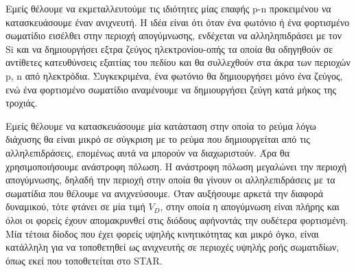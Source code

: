 	Εμείς θέλουμε να εκμεταλλευτούμε τις ιδιότητες μίας επαφής p-n προκειμένου να κατασκευάσουμε έναν ανιχνευτή. Η ιδέα είναι ότι όταν ένα φωτόνιο ή ένα φορτισμένο σωματίδιο εισέλθει στην περιοχή απογύμνωσης, ενδέχεται να αλληληπιδράσει με τον Si και να δημιουργήσει εξτρα ζεύγος ηλεκτρονίου-οπής τα οποία θα οδηγηθούν σε αντίθετες κατευθύνσεις εξαιτίας του πεδίου και θα συλλεχθούν στα άκρα των περιοχών p, n από ηλεκτρόδια. Συγκεκριμένα, ένα φωτόνιο θα δημιουργήσει μόνο ένα ζεύγος, ενώ ένα φορτισμένο σωματίδιο αναμένουμε να δημιουργήσει ζεύγη κατά μήκος της τροχιάς.
	 
	 Εμείς θέλουμε να κατασκευάσουμε μία κατάσταση στην οποία το ρεύμα λόγω διάχυσης θα είναι μικρό σε σύγκριση με το ρεύμα που δημιουργείται από τις αλληλεπιδράσεις, επομένως αυτά να μπορούν να διαχωριστούν. Άρα θα χρησιμοποιήσουμε ανάστροφη πόλωση. Η ανάστροφη πόλωση μεγαλώνει την περιοχή απογύμνωσης, δηλαδή την περιοχή στην οποία θα γίνουν οι αλληλεπιδράσεις με τα σωματίδια που θέλουμε να ανιχνεύσουμε.
	Όταν αυξήσουμε αρκετά την διαφορά δυναμικού, τότε φτάνει σε μία τιμή $V_D$, στην οποία η απογύμνωση είναι πλήρης και όλοι οι φορείς έχουν απομακρυνθεί στις διόδους αφήνοντάς την ουδέτερα φορτισμένη.	
	Μία τέτοια δίοδος που  έχει φορείς υψηλής κινητικότητας και μικρό όγκο,  είναι κατάλληλη για να τοποθετηθεί ως ανιχνευτής σε περιοχές υψηλής ροής σωματιδίων, όπως εκεί που τοποθετείται στο STAR.
	
